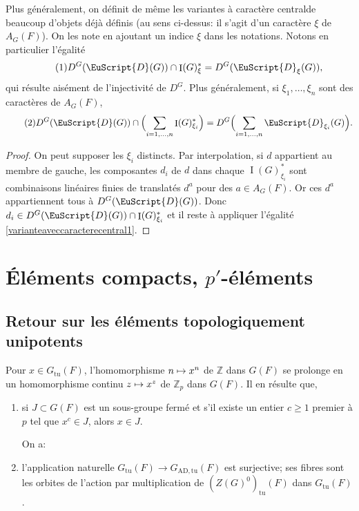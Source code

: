 \documentclass[JEP,XML,SOM,Unicode,francais]{cedram}
\let\mathcal \EuScript
\newcommand\mto{\mathchoice{\longmapsto}{\mapsto}{\mapsto}{\mapsto}}
\newcommand{\AD}{\mathrm{AD}}
\newcommand{\tu}{\mathrm{tu}}
\DeclareMathOperator{\rI}{I}
\newcommand{\cD}{\mathcal{D}}
\newcommand{\ZZ}{\mathbb{Z}}
\theoremstyle{plain}
\theoremstyle{definition}
\begin{document}
Plus généralement, on définit de même les variantes \og à caractère central\fg de beaucoup d'objets déjà définis (au sens ci-dessus: il s'agit d'un caractère $\xi$ de $A_{G}(F)$). On les note en ajoutant un indice $\xi$ dans les notations. Notons en particulier l'égalité%
\begin{equation}\tag{1}\label{varianteaveccaracterecentral1}
D^G(\cD(G))\cap \rI(G)^*_{\xi}=D^G(\cD_{\xi}(G)),
\end{equation}
qui résulte aisément de l'injectivité de $D^G$.
Plus généralement, si $\xi_{1},\dots,\xi_{n}$ sont des caractères de $A_{G}(F)$,
\begin{equation}\tag{2}\label{varianteaveccaracterecentral2}
D^G(\cD(G))\cap \Bigl(\sum_{i=1,\dots,n}\rI(G)^*_{\xi_{i}}\Bigr)=D^G\Bigl(\sum_{i=1,\dots,n}\cD_{\xi_{i}}(G)\Bigr).
\end{equation}

\begin{proof}
On peut supposer les $\xi_{i}$ distincts. Par interpolation, si $d$ appartient au membre de gauche, les composantes $d_{i}$ de $d$ dans chaque $\rI(G)^*_{\xi_{i}}$ sont combinaisons linéaires finies de translatés $d^{a}$ pour des $a\in A_{G}(F)$. Or ces $d^{a}$ appartiennent tous à $D^G(\cD(G))$. Donc $d_{i}\in D^G(\cD(G))\cap \rI(G)^*_{\xi_{i}}$ et il reste à appliquer l'égalité \eqref{varianteaveccaracterecentral1}.
\end{proof}

\section{Éléments compacts, \texorpdfstring{$p'$}{p'}-éléments}

\subsection{Retour sur les éléments topologiquement unipotents}\label{retour}
Pour $x\in G_{\tu}(F)$, l'homomorphisme $n\mto x^n$ de $\ZZ$ dans $G(F)$ se prolonge en un homomorphisme continu $z\mto x^z$ de $\ZZ_{p}$ dans $G(F)$. Il en résulte que,
\begin{enumerate}
\item\label{retour1}
si $J\subset G(F)$ est un sous-groupe fermé et s'il existe un entier $c\geq1$ premier à $p$ tel que $x^c\in J$, alors $x\in J$.

\noindent
On a:
\item\label{retour2}
l'application naturelle $G_{\tu}(F)\to G_{\AD,\tu}(F)$ est surjective; ses fibres sont les orbites de l'action par multiplication de $(Z(G)^0)_{\tu}(F)$ dans $G_{\tu}(F)$.
\end{enumerate}
\end{document}
